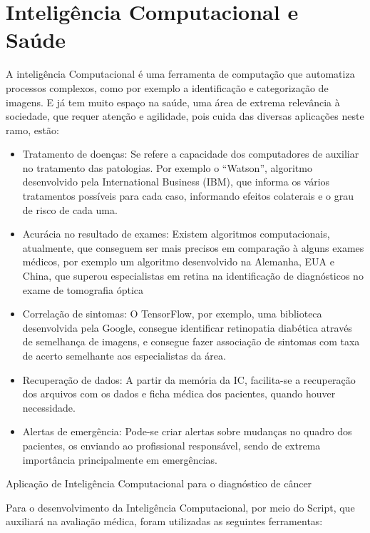 \chapter{Inteligência Computacional e Saúde}
\label{chapter:inteligencia_computacional_e_saude}

A inteligência Computacional é uma ferramenta de computação que automatiza processos complexos, como por exemplo a identificação e categorização de imagens. E já tem muito espaço na saúde, uma área de extrema relevância à sociedade, que requer atenção e agilidade, pois cuida das diversas aplicações neste ramo, estão:

\begin{itemize}
\item Tratamento de doenças: Se refere a capacidade dos computadores de auxiliar no tratamento das patologias. Por exemplo o “Watson”, algoritmo desenvolvido pela International Business (IBM), que informa os vários tratamentos possíveis para cada caso, informando efeitos colaterais e o grau de risco de cada uma.

\item Acurácia no resultado de exames: Existem algoritmos computacionais, atualmente, que conseguem ser mais precisos em comparação à alguns exames médicos, por exemplo um algoritmo desenvolvido na Alemanha, EUA e China, que superou especialistas em retina na identificação de diagnósticos no exame de tomografia óptica

\item Correlação de sintomas: O TensorFlow, por exemplo, uma biblioteca desenvolvida pela Google, consegue identificar retinopatia diabética através de semelhança de imagens, e consegue fazer associação de sintomas com taxa de acerto semelhante aos especialistas da área.

\item Recuperação de dados: A partir da memória da IC, facilita-se a recuperação dos arquivos com os dados e ficha médica dos pacientes, quando houver necessidade.

\item Alertas de emergência: Pode-se criar alertas sobre mudanças no quadro dos pacientes, os enviando ao profissional responsável, sendo de extrema importância principalmente em emergências.
\end{itemize}

 Aplicação de Inteligência Computacional para o diagnóstico de câncer

Para o desenvolvimento da Inteligência Computacional, por meio do Script, que auxiliará na avaliação médica, foram utilizadas as seguintes ferramentas:

